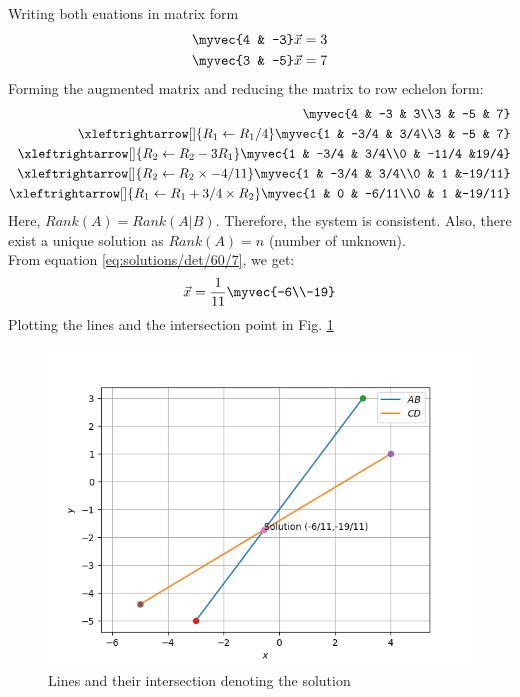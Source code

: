 Writing both euations in matrix form
\begin{align}
    \myvec{4 & -3}\vec{x}=3\\
    \myvec{3 & -5}\vec{x}=7
\end{align}
Forming the augmented matrix and reducing the matrix to row echelon form:
\begin{align}
\myvec{4 & -3 & 3\\3 & -5 & 7}\\
\xleftrightarrow[]{R_1\leftarrow R_1/4}
\myvec{1 & -3/4 & 3/4\\3 & -5 & 7}\\
\xleftrightarrow[]{R_2\leftarrow R_2-3R_1}   
\myvec{1 & -3/4 & 3/4\\0 & -11/4 &19/4}\\
\xleftrightarrow[]{R_2\leftarrow R_2\times-4/11}
\myvec{1 & -3/4 & 3/4\\0 & 1 &-19/11}\\
\xleftrightarrow[]{R_1\leftarrow R_1+3/4\times R_2}
\myvec{1 & 0 & -6/11\\0 & 1 &-19/11} \label{eq:solutions/det/60/7}
\end{align}
Here, $Rank(A)=Rank(A|B)$. Therefore, the system is consistent. Also, there exist a unique solution as $Rank(A)=n$ (number of unknown).\\ 
From equation \ref{eq:solutions/det/60/7}, we get:
\begin{align}
    \vec{x}=\frac{1}{11}\myvec{-6\\-19}
\end{align}
Plotting the lines and the intersection point in Fig. \ref{Fig4:solutions/det/60/}

\begin{figure}[h!]
\centering
\includegraphics[width=\columnwidth]{./solutions/det/60/Figure_31}
\caption{Lines and their intersection denoting the solution}
\label{Fig4:solutions/det/60/}
\end{figure}

